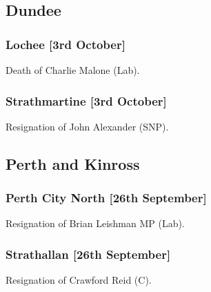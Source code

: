 \documentclass[a4paper,openany]{book}
\begin{document}
\begin{resultsiii}
\subsection*{Dundee}

\subsubsection*{Lochee \hspace*{\fill}\nolinebreak[1]%
	\enspace\hspace*{\fill}
	[3rd October]}


Death of Charlie Malone (Lab).

\subsubsection*{Strathmartine \hspace*{\fill}\nolinebreak[1]%
	\enspace\hspace*{\fill}
	[3rd October]}


Resignation of John Alexander (SNP).

\subsection*{Perth and Kinross}

\subsubsection*{Perth City North \hspace*{\fill}\nolinebreak[1]%
	\enspace\hspace*{\fill}
	[26th September]}


Resignation of Brian Leishman MP (Lab).

\subsubsection*{Strathallan \hspace*{\fill}\nolinebreak[1]%
	\enspace\hspace*{\fill}
	[26th September]}


Resignation of Crawford Reid (C).

\end{resultsiii}
\end{document}
